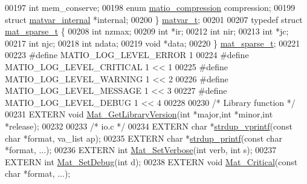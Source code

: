 \begin{DoxyCode}
00197     \textcolor{keywordtype}{int}   mem\_conserve;               
00198     \textcolor{keyword}{enum} \hyperlink{group___m_a_t_ga768c318af97bd2567758ecb001ceb7f4}{matio\_compression}  compression; 
00199     \textcolor{keyword}{struct }\hyperlink{structmatvar__internal}{matvar\_internal} *\textcolor{keyword}{internal};    
00200 \} \hyperlink{group___m_a_t_ga24775c96a2a6d073581639c780b7896c}{matvar\_t};
00201 
00207 \textcolor{keyword}{typedef} \textcolor{keyword}{struct }\hyperlink{group___m_a_t_structmat__sparse__t}{mat\_sparse\_t} \{
00208     \textcolor{keywordtype}{int} nzmax;               
00209     \textcolor{keywordtype}{int} *ir;                 
00212     \textcolor{keywordtype}{int} nir;                 
00213     \textcolor{keywordtype}{int} *jc;                 
00217     \textcolor{keywordtype}{int}   njc;               
00218     \textcolor{keywordtype}{int}   ndata;             
00219     \textcolor{keywordtype}{void} *data;              
00220 \} \hyperlink{group___m_a_t_gad1332d0eb4faa5a99377919f84b77baf}{mat\_sparse\_t};
00221 
00223 \textcolor{preprocessor}{#define MATIO\_LOG\_LEVEL\_ERROR    1}
00224 \textcolor{preprocessor}{#define MATIO\_LOG\_LEVEL\_CRITICAL 1 << 1}
00225 \textcolor{preprocessor}{#define MATIO\_LOG\_LEVEL\_WARNING  1 << 2}
00226 \textcolor{preprocessor}{#define MATIO\_LOG\_LEVEL\_MESSAGE  1 << 3}
00227 \textcolor{preprocessor}{#define MATIO\_LOG\_LEVEL\_DEBUG    1 << 4}
00228 
00230 \textcolor{comment}{/* Library function */}
00231 EXTERN \textcolor{keywordtype}{void} \hyperlink{mat_8c_a2069c4f0d1106778b56216ff4f95f94b}{Mat\_GetLibraryVersion}(\textcolor{keywordtype}{int} *major,\textcolor{keywordtype}{int} *minor,\textcolor{keywordtype}{int} *release);
00232 
00233 \textcolor{comment}{/* io.c */}
00234 EXTERN \textcolor{keywordtype}{char}  *\hyperlink{group__mat__util_ga2b342987d3b664345cb233640b611fe9}{strdup\_vprintf}(\textcolor{keyword}{const} \textcolor{keywordtype}{char} *format, va\_list ap);
00235 EXTERN \textcolor{keywordtype}{char}  *\hyperlink{group__mat__util_ga291b08f933c75fb70e3736b669896ebd}{strdup\_printf}(\textcolor{keyword}{const} \textcolor{keywordtype}{char} *format, ...);
00236 EXTERN \textcolor{keywordtype}{int}    \hyperlink{group__mat__util_gaf348b811ee26bfc923924878cea3c9ba}{Mat\_SetVerbose}(\textcolor{keywordtype}{int} verb, \textcolor{keywordtype}{int} s);
00237 EXTERN \textcolor{keywordtype}{int}    \hyperlink{group__mat__util_gad75e2962dcaf2ac366f2420bb5b13094}{Mat\_SetDebug}(\textcolor{keywordtype}{int} d);
00238 EXTERN \textcolor{keywordtype}{void}   \hyperlink{group__mat__util_gaf51f2bfbb5580f575e4dd79757e2b80c}{Mat\_Critical}(\textcolor{keyword}{const} \textcolor{keywordtype}{char} *format, ...);

\end{DoxyCode}
